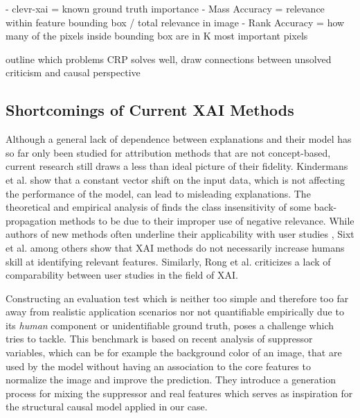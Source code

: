 \cite{Arras2022}
- clevr-xai = known ground truth importance
- Mass Accuracy = relevance within feature bounding box / total relevance in image
- Rank Accuracy = how many of the pixels inside bounding box are in K most important pixels


{\color{red} outline which problems CRP solves well, draw connections between unsolved criticism and causal perspective}

\subsection{Shortcomings of Current XAI Methods}

Although a general lack of dependence between explanations and their model \cite{Adebayo2018,Karimi2023} has so far only been studied for attribution methods that are not concept-based, current research still draws a less than ideal picture of their fidelity.
Kindermans et al. \cite{Kindermans2019} show that a constant vector shift on the input data, which is not affecting the performance of the model, can lead to misleading explanations. The theoretical and empirical analysis of \cite{Sixt2020} finds the class insensitivity of some back-propagation methods to be due to their improper use of negative relevance.
While authors of new methods often underline their applicability with user studies \cite{Achtibat2023,Fel2023,Ghorbani2019,Zhang2021}, Sixt et al. \cite{Sixt2022a} among others \cite{Singla2022} show that XAI methods do not necessarily increase humans skill at identifying relevant features. Similarly, Rong et al. \cite{Rong2023} criticizes a lack of comparability between user studies in the field of XAI. 

Constructing an evaluation test which is neither too simple and therefore too far away from realistic application scenarios nor not quantifiable empirically due to its \textit{human} component or unidentifiable ground truth, poses a challenge which \cite{Clark2023} tries to tackle. This benchmark is based on recent analysis \cite{Wilming2023} of suppressor variables, which can be for example the background color of an image, that are used by the model without having an association to the core features to normalize the image and improve the prediction.
They introduce a generation process for mixing the suppressor and real features which serves as inspiration for the structural causal model applied in our case.


